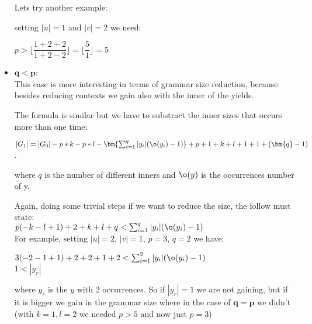 \begin{itemize}
		Lets try another example:

		setting $|u|=1$ and $|v|=2$ we need:
		\begin{center}
			$p> \lfloor \dfrac{1+2+2}{1+2-2} \rfloor = \lfloor \dfrac{5}{1} \rfloor = 5 $
		\end{center}

	\item $\bm{q<p}$:\\
		This case is more interesting in terms of grammar size reduction, because besides reducing contexts we gain also with the inner of the yields.

		The formula is similar but we have to substract the inner sizes that occurs more than one time:
		\begin{center}
		$|G_1| = |G_0| -p*k -p*l -\bm{\sum_{i=1}^{q}|y_i|(\o(y_i)-1)}+ p + 1 + k + l + 1 + 1 + (\bm{q}-1)$. \\
		\end{center}

		where $q$ is the number of different inners and $\o(y)$ is the occurrences number of y. 

		Again, doing some trivial steps if we want to reduce the size, the follow must state: \\

		$p(-k-l+1) + 2 +k+l+q < \sum_{i=1}^{q}|y_i|(\o(y_i)-1)$\\

		For example, setting $|u|=2$, $|v|=1$, $p=3$, $q=2$ we have:
		\begin{center}
		$3(-2-1+1) + 2 +2+1+2 < \sum_{i=1}^{2}|y_i|(\o(y_i)-1)$\\
		$1<|y_r|$
		\end{center}
		where $y_r$ is the $y$ with 2 occurrences. 
		So if $|y_r| =1$ we are not gaining, but if it is bigger we gain in the grammar size where in the case of $\bm{q=p}$ we didn't (with $k=1,l=2$ we needed $p>5$ and now just $p=3$)
	

\end{itemize}



